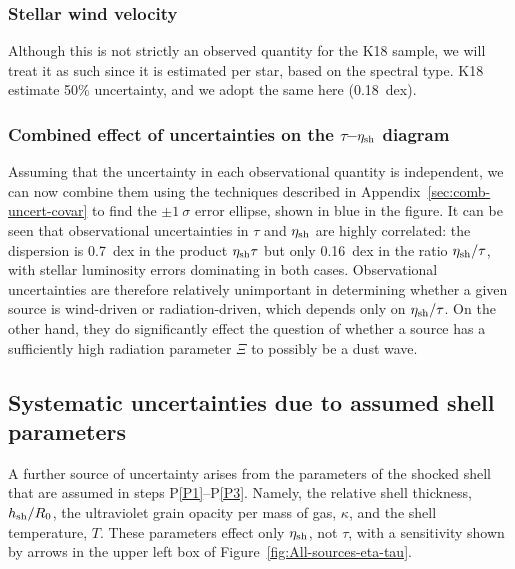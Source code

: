 \subsubsection{Stellar wind velocity}
\label{sec:stell-wind-veloc}

Although this is not strictly an observed quantity for the K18 sample,
we will treat it as such since it is estimated per star, based on the
spectral type.  K18 estimate 50\% uncertainty, and we adopt the same
here (0.18~dex).


\subsubsection{Combined effect of uncertainties on the
  \(\tau\)--\(\eta_{\text{sh}}\) diagram}
\label{sec:comb-effect-uncert}

Assuming that the uncertainty in each observational quantity is
independent, we can now combine them using the techniques described in
Appendix~\ref{sec:comb-uncert-covar} to find the \(\pm 1~\sigma\) error
ellipse, shown in blue in the figure.  It can be seen that
observational uncertainties in \(\tau\) and \(\eta_{\text{sh}}\) are highly
correlated: the dispersion is \SI{0.7}{dex} in the product
\(\eta_{\text{sh}} \tau\) but only \SI{0.16}{dex} in the ratio
\(\eta_{\text{sh}}/\tau\), with stellar luminosity errors dominating in both
cases.  Observational uncertainties are therefore relatively
unimportant in determining whether a given source is wind-driven or
radiation-driven, which depends only on \(\eta_{\text{sh}}/\tau\).  On the other
hand, they do significantly effect the question of whether a source
has a sufficiently high radiation parameter \(\Xi\) to possibly be a
dust wave.


\subsection{Systematic uncertainties due to assumed shell parameters}
\label{sec:syst-uncert-due}

A further source of uncertainty arises from the parameters of the
shocked shell that are assumed in steps P\ref{P1}--P\ref{P3}. Namely,
the relative shell thickness, \(h_{\text{sh}}/R_0\), the ultraviolet grain
opacity per mass of gas, \(\kappa\), and the shell temperature, \(T\).
These parameters effect only \(\eta_{\text{sh}}\), not \(\tau\), with a
sensitivity shown by arrows in the upper left box of
Figure~\ref{fig:All-sources-eta-tau}.


